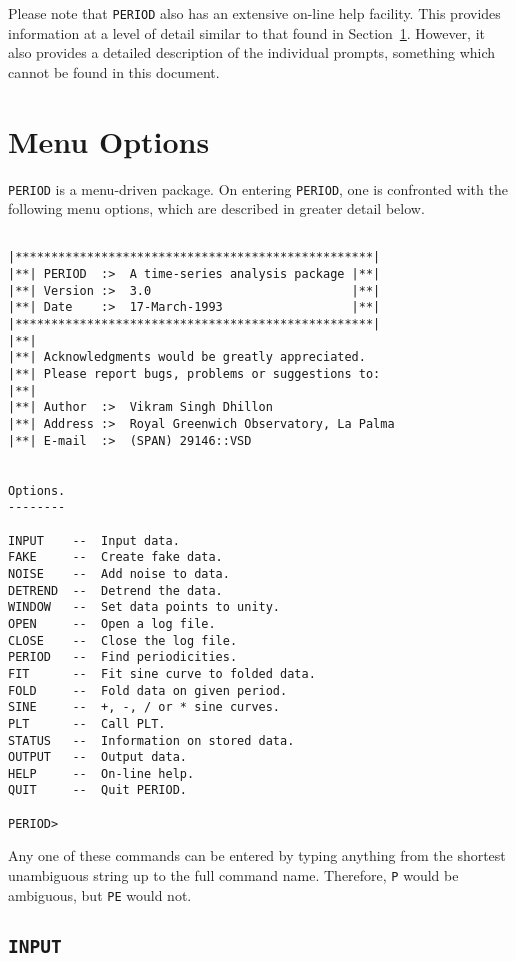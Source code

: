 Please note that {\tt PERIOD} also has an extensive on-line help facility.
This provides information at a level of detail similar to that found in 
Section~\ref{menu}. However, it also provides a detailed description of 
the individual prompts, something which cannot be found in this document.

\section{Menu Options}
\label{menu}

{\tt PERIOD} is a menu-driven package. On entering {\tt PERIOD}, one is
confronted with the following menu options, which are described in greater
detail below.

\begin{verbatim}
          
|**************************************************|
|**| PERIOD  :>  A time-series analysis package |**|
|**| Version :>  3.0                            |**|
|**| Date    :>  17-March-1993                  |**|
|**************************************************|
|**|
|**| Acknowledgments would be greatly appreciated.
|**| Please report bugs, problems or suggestions to:
|**|
|**| Author  :>  Vikram Singh Dhillon
|**| Address :>  Royal Greenwich Observatory, La Palma
|**| E-mail  :>  (SPAN) 29146::VSD
        
 
Options.
--------

INPUT    --  Input data.
FAKE     --  Create fake data.
NOISE    --  Add noise to data.
DETREND  --  Detrend the data.
WINDOW   --  Set data points to unity.
OPEN     --  Open a log file.
CLOSE    --  Close the log file.
PERIOD   --  Find periodicities.
FIT      --  Fit sine curve to folded data.
FOLD     --  Fold data on given period.
SINE     --  +, -, / or * sine curves.
PLT      --  Call PLT.
STATUS   --  Information on stored data.
OUTPUT   --  Output data.
HELP     --  On-line help.
QUIT     --  Quit PERIOD.

PERIOD> 

\end{verbatim}

Any one of these commands can be entered by typing anything from the shortest
unambiguous string up to the full command name. Therefore, {\tt P} would be
ambiguous, but {\tt PE} would not.

\subsection*{\tt INPUT}

